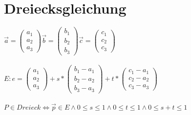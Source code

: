 \documentclass[12pt,a4paper]{article}
\begin{document}
\section*{Dreiecksgleichung}
$\overrightarrow{a} = \left(\begin{array}{c} a_1 \\ a_2 \\ a_3\end{array}\right) \overrightarrow{b} = \left(\begin{array}{c} b_1 \\ b_2 \\ b_3\end{array}\right) \overrightarrow{c} = \left(\begin{array}{c} c_1 \\ c_2 \\ c_3\end{array}\right) $\\ \\
$E: e= \left(\begin{array}{c} a_1 \\ a_2 \\ a_3\end{array}\right) + s*\left(\begin{array}{c} b_1 - a_1 \\ b_2 - a_2 \\ b_3 - a_3\end{array}\right) + t*\left(\begin{array}{c} c_1 - a_1 \\ c_2 - a_2 \\ c_3 - a_3\end{array}\right)$\\ \\
$P \in Dreieck \Leftrightarrow \overrightarrow{p} \in E \wedge 0\leq s \leq 1 \wedge 0\leq t \leq 1\wedge 0\leq s+t \leq 1$\\
\end{document}
